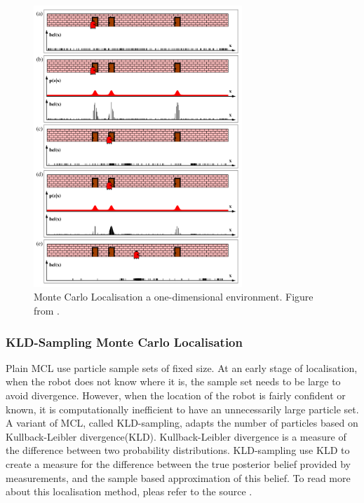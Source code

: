 \begin{figure}[htp]
  \centering
  \includegraphics[width = 0.7\textwidth]{Figures/figMCL.pdf}
  \caption{Monte Carlo Localisation a one-dimensional environment. Figure from \cite{ThrunSebastian2005Pr}.}
  \label{fig:monteCarloLocalisation}
\end{figure}

\subsubsection{KLD-Sampling Monte Carlo Localisation}
Plain MCL use particle sample sets of fixed size. At an early stage of localisation, when the robot does not know where it is, the sample set needs to be large to avoid divergence. However, when the location of the robot is fairly confident or known, it is computationally inefficient to have an unnecessarily large particle set. A variant of MCL, called KLD-sampling, adapts the number of particles based on Kullback-Leibler divergence(KLD). Kullback-Leibler divergence is a measure of the difference between two probability distributions. KLD-sampling use KLD to create a measure for the difference between the true posterior belief provided by measurements, and the sample based approximation of this belief. To read more about this localisation method, pleas refer to the source \cite{ThrunSebastian2005Pr}.

